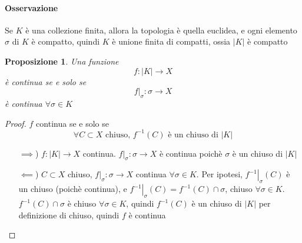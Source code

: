 \documentclass[a4paper]{report}
\newtheorem{proposition}{Proposizione}
\newcommand{\ra}{\ensuremath{\rightarrow}}
\begin{document}
\paragraph{Osservazione} Se $K$ è una collezione finita, allora la topologia è quella euclidea, e ogni elemento $\sigma$ di $K$ è compatto, quindi $K$ è unione finita di compatti, ossia $|K|$ è compatto
\begin{proposition}
    Una funzione
    \[
        f:|K|\ra X
    \]
    è continua se e solo se
    \[
        \left.f\right|_\sigma:\sigma\ra X
    \]
    è continua $\forall\sigma\in K$
\end{proposition}
\begin{proof}
    $f$ continua se e solo se
    \[
        \forall C\subset X\text{ chiuso, } f^{-1}(C)\text{ è un chiuso di }|K|
    \]
    \begin{itemize}
        \item [$\implies$)] $f:|K|\ra X$ continua. $\left.f\right|_\sigma:\sigma\ra X$ è continua poichè $\sigma$ è un chiuso di $|K|$
        \item [$\impliedby$)] $C\subset X$ chiuso, $\left.f\right|_\sigma:\sigma\ra X$ continua $\forall\sigma\in K$. Per ipotesi, $\left.f^{-1}\right|_\sigma(C)$ è un chiuso (poichè continua), e $\left.f^{-1}\right|_\sigma(C)=f^{-1}(C)\cap\sigma$, chiuso $\forall\sigma\in K$.\\
              $f^{-1}(C)\cap\sigma$ è chiuso $\forall\sigma\in K$, quindi $f^{-1}(C)$ è un chiuso di $|K|$ per definizione di chiuso, quindi $f$ è continua
    \end{itemize}
\end{proof}
\end{document}
